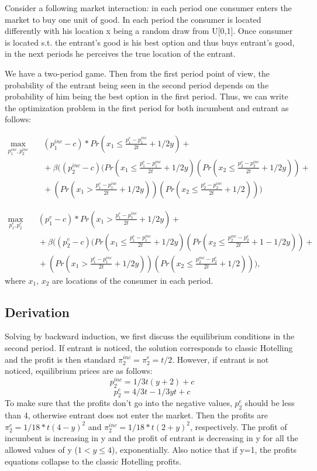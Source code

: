 \documentclass{article}
\begin{document}
    Consider a following market interaction: in each period one consumer enters the market to buy one unit of good. In each period the consumer  is located differently with his location x being a random draw from U[0,1]. Once consumer is located s.t. the entrant's good is his best option and thus buys entrant's good, in the next periods he perceives the true location of the entrant.
    
    We have a two-period game. Then from the first period point of view, the probability of the entrant being seen in the second period depends on the probability of him being the best option in the first period. Thus, we can write the optimization problem in the first period for both incumbent and entrant as follows:
    
    $$ \begin{aligned}
    \max_{p^{inc}_1, p^{inc}_2} {}
    & \quad (p^{inc}_1-c)* Pr(x_1 \leq \frac{p^{e}_1-p^{inc}_1}{2t} + 1/2y) + \\
    & \quad + \beta((p^{inc}_2-c)(Pr(x_1 \leq \frac{p^{e}_1-p^{inc}_1}{2t} + 1/2y)(Pr(x_2 \leq \frac{p^{e}_2-p^{inc}_2}{2t} + 1/2y)) + \\
    & \quad + (Pr(x_1 > \frac{p^{e}_1-p^{inc}_1}{2t} + 1/2y))(Pr(x_2 \leq \frac{p^{e}_2-p^{inc}_2}{2t} + 1/2)))
    \end{aligned}
    $$

    $$ \begin{aligned}
    \max_{p^{e}_1, p^{e}_2} {}
    & \quad (p^{e}_1-c)* Pr(x_1 > \frac{p^{e}_1-p^{inc}_1}{2t} + 1/2y) + \\
    & \quad + \beta((p^{e}_2-c)(Pr(x_1 \leq \frac{p^{e}_1-p^{inc}_1}{2t} + 1/2y)(Pr(x_2 \leq \frac{p^{inc}_2-p^{e}_2}{2t} + 1 - 1/2y)) + \\
    & \quad + (Pr(x_1 > \frac{p^{e}_1-p^{inc}_1}{2t} + 1/2y))(Pr(x_2 \leq \frac{p^{inc}_2-p^{e}_2}{2t} + 1/2))),
    \end{aligned}
    $$
where $x_1$, $x_2$ are locations of the consumer in each period. 

\subsection{Derivation}
    
Solving by backward induction, we first discuss the equilibrium conditions in the second period. 
If entrant is noticed, the solution corresponds to classic Hotelling and the profit is then standard $\pi_{2}^{inc} = \pi_{2}^{e}= t/2$. However, if entrant is not noticed, equilibrium prices are as follows:
$$
p^{inc}_2 =1/3t(y+ 2) + c $$
$$ p^{e}_2 =4/3t - 1/3yt + c$$
To make sure that the profits don't go into the negative values, $ p^{e}_2$ should be less than 4, otherwise entrant does not enter the market. Then the profits are $\pi_{2}^{e} = 1/18*t(4-y)^2$ and $\pi_{2}^{inc}=1/18*t(2+y)^2$, respectively. The profit of incumbent is increasing in y and the profit of entrant is decreasing in y for all the allowed values of y ($1<y\leq4$), exponentially. Also notice that if y=1, the profits equations collapse to the classic Hotelling profits. 
\end{document}
